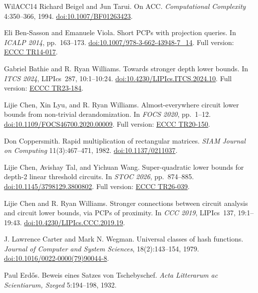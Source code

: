 \documentclass[11pt,letterpaper]{article}
\theoremstyle{definition}
\theoremstyle{remark}
\begin{document}
\begin{thebibliography}{WilACC14}
Richard Beigel and Jun Tarui. On ACC.
\emph{Computational Complexity} 4:350--366, 1994.
\href{https://doi.org/10.1007/BF01263423}{doi:10.1007/BF01263423}.

Eli Ben-Sasson and Emanuele Viola. Short PCPs with projection queries.
In \emph{ICALP 2014}, pp.~163--173.
\href{https://doi.org/10.1007/978-3-662-43948-7_14}{doi:10.1007/978-3-662-43948-7\_14}.
Full version: \href{https://eccc.weizmann.ac.il/report/2014/017/}{ECCC TR14-017}.

Gabriel Bathie and R. Ryan Williams. Towards stronger depth lower
bounds. In \emph{ITCS 2024}, LIPIcs~287, 10:1--10:24.
\href{https://doi.org/10.4230/LIPIcs.ITCS.2024.10}{doi:10.4230/LIPIcs.ITCS.2024.10}.
Full version: \href{https://eccc.weizmann.ac.il/report/2023/184/}{ECCC TR23-184}.

Lijie Chen, Xin Lyu, and R. Ryan Williams.
Almost-everywhere circuit lower bounds from non-trivial derandomization.
In \emph{FOCS 2020}, pp.~1--12.
\href{https://doi.org/10.1109/FOCS46700.2020.00009}{doi:10.1109/FOCS46700.2020.00009}.
Full version: \href{https://eccc.weizmann.ac.il/report/2020/150/}{ECCC TR20-150}.

Don Coppersmith. Rapid multiplication of rectangular matrices.
\emph{SIAM Journal on Computing} 11(3):467--471, 1982.
\href{https://doi.org/10.1137/0211037}{doi:10.1137/0211037}.

Lijie Chen, Avishay Tal, and Yichuan Wang.
Super-quadratic lower bounds for depth-2 linear threshold circuits.
In \emph{STOC 2026}, pp.~874--885.
\href{https://doi.org/10.1145/3798129.3800802}{doi:10.1145/3798129.3800802}.
Full version: \href{https://eccc.weizmann.ac.il/report/2026/039/}{ECCC TR26-039}.

Lijie Chen and R. Ryan Williams.
Stronger connections between circuit analysis and circuit lower
bounds, via PCPs of proximity.
In \emph{CCC 2019}, LIPIcs~137, 19:1--19:43.
\href{https://doi.org/10.4230/LIPIcs.CCC.2019.19}{doi:10.4230/LIPIcs.CCC.2019.19}.

J. Lawrence Carter and Mark N. Wegman.
\newblock Universal classes of hash functions.
\newblock \emph{Journal of Computer and System Sciences}, 18(2):143--154, 1979.
\newblock \href{https://doi.org/10.1016/0022-0000(79)90044-8}{doi:10.1016/0022-0000(79)90044-8}.


Paul Erd\H{o}s. Beweis eines Satzes von Tschebyschef.
\emph{Acta Litterarum ac Scientiarum, Szeged} 5:194--198, 1932.


\end{thebibliography}
\end{document}
